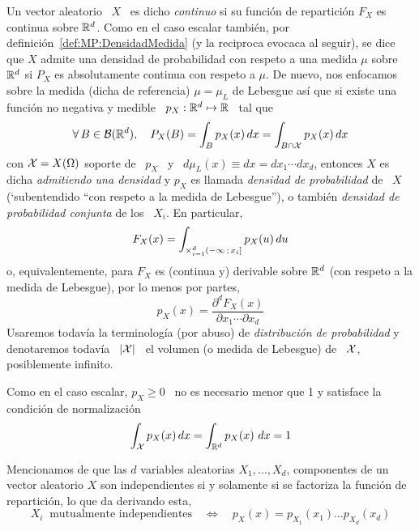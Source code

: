 \begin{definicion}
  Un  vector aleatorio  \  $X$ \  es dicho  {\it  continuo} si  su funci\'on  de
  repartici\'on  $F_X$ es  continua sobre  $\mathbb{R}^d$.  Como  en el  caso escalar
  tambi\'en,   por  definici\'on~\ref{def:MP:DensidadMedida}  (y   la  reciproca
  evocaca al  seguir), se dice que  $X$ admite una densidad  de probabilidad con
  respeto a una medida $\mu$  sobre $\mathbb{R}^d$ si $P_X$ es absolutamente continua
  con  respeto a  $\mu$.  De  nuevo,  nos enfocamos  sobre la  medida (dicha  de
  referencia) $\mu  = \mu_L$ de  Lebesgue as\'i que  si existe una  funci\'on no
  negativa y medible \ $p_X: \mathbb{R}^d \mapsto \mathbb{R}$ \ tal que
  \[
  \forall \,  B \in \mathcal{B}(\mathbb{R}^d),  \quad P_X(B) =  \int_B p_X(x) \, dx  = \int_{B
    \cap \mathcal{X}} p_X(x) \, dx
  \]
  con $\mathcal{X}  = X(\Omega)$ soporte  de \ $p_X$  \ y \  $d\mu_L(x) \equiv dx  = dx_1
  \cdots dx_d$, entonces  $X$ es dicha {\it admitiendo una  densidad} y $p_X$ es
  llamada {\it densidad de probabilidad} de \ $X$ (`subentendido ``con respeto a
  la medida de Lebesgue''), o  tambi\'en {\it densidad de probabilidad conjunta}
  de los \ $X_i$. En particular,
  \[
  F_X(x) =  \int_{\operatorname*{\times}_{i=1}^d (-\infty \, ;  \, x_i]} p_X(u) \, du
  \]
  o, equivalentemente, para $F_X$ es (continua y) derivable sobre $\mathbb{R}^d$ (con
  respeto a la medida de Lebesgue), por lo menos por partes,
  \[
  p_X(x) = \frac{\partial^d F_X(x)}{\partial x_1 \cdots \partial x_d}
  \]
  Usaremos  todav\'ia la terminolog\'ia  (por abuso)  de {\it  distribuci\'on de
    probabilidad} y  denotaremos todav\'ia  \ $|\mathcal{X}|$ \  el volumen (o  medida de
  Lebesgue) de \ $\mathcal{X}$, posiblemente infinito.
\end{definicion}

Como en el caso  escalar, $p_X \ge 0$ \ no es necesario  menor que 1 y satisface
la condici\'on de normalizaci\'on
%
\[
\int_{\mathcal{X}} p_X(x) \, dx = \int_{\mathbb{R}^d} p_X(x) \ dx  = 1
\]

Mencionamos de que las $d$  variables aleatorias $X_1, \ldots, X_d$, componentes
de un vector aleatorio $X$ son  independientes si y solamente si se factoriza la
funci\'on de repartici\'on, lo que da derivando esta,
%
\[
X_i \:  \mbox{ mutualmente independientes} \quad \Leftrightarrow  \quad p_X(x) =
p_{X_1}(x_1) \ldots p_{X_d}(x_d)
\]


